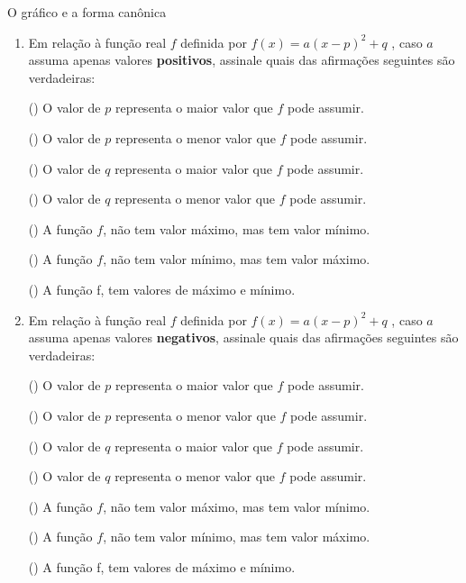 \begin{task}{O gráfico e a forma canônica}
\begin{enumerate}
\begin{figure}[H]
\end{figure}
(\phantom{x}) \(D=[-4,3]\) e \(I=[-4,3]\)

(\phantom{x}) \(D=\mathbb{R}\) e \(I=]-\infty,-4]\)

(\phantom{x}) \(D=[-5,5]\) e \(I=[-5,5]\)

(\phantom{x}) \(D=[-4,3]\) e \(I=[-4,+\infty[\)

(\phantom{x}) \(D=\mathbb{R}\) e \(I=\mathbb{R}\)

\item {} 
Em relação à função real \(f\) definida por \(f(x)=a(x-p)^2+q\) , caso \(a\) assuma apenas valores \textbf{positivos}, assinale quais das afirmações seguintes são verdadeiras:

(\phantom{x}) O valor de \(p\) representa o maior valor que \(f\) pode assumir.

(\phantom{x}) O valor de \(p\) representa o menor valor que \(f\) pode assumir.

(\phantom{x}) O valor de \(q\) representa o maior valor que \(f\) pode assumir.

(\phantom{x}) O valor de \(q\) representa o menor valor que \(f\) pode assumir.

(\phantom{x}) A função \(f\), não tem valor máximo, mas tem valor mínimo.

(\phantom{x}) A função \(f\), não tem valor mínimo, mas tem valor máximo.

(\phantom{x}) A função f, tem valores de máximo e mínimo.

\item {} 
Em relação à função real \(f\) definida por \(f(x)=a(x-p)^2+q\) , caso \(a\) assuma apenas valores \textbf{negativos}, assinale quais das afirmações seguintes são verdadeiras:

(\phantom{x}) O valor de \(p\) representa o maior valor que \(f\) pode assumir.

(\phantom{x}) O valor de \(p\) representa o menor valor que \(f\) pode assumir.

(\phantom{x}) O valor de \(q\) representa o maior valor que \(f\) pode assumir.

(\phantom{x}) O valor de \(q\) representa o menor valor que \(f\) pode assumir.

(\phantom{x}) A função \(f\), não tem valor máximo, mas tem valor mínimo.

(\phantom{x}) A função \(f\), não tem valor mínimo, mas tem valor máximo.

(\phantom{x}) A função f, tem valores de máximo e mínimo.


\end{enumerate}
\end{task}
